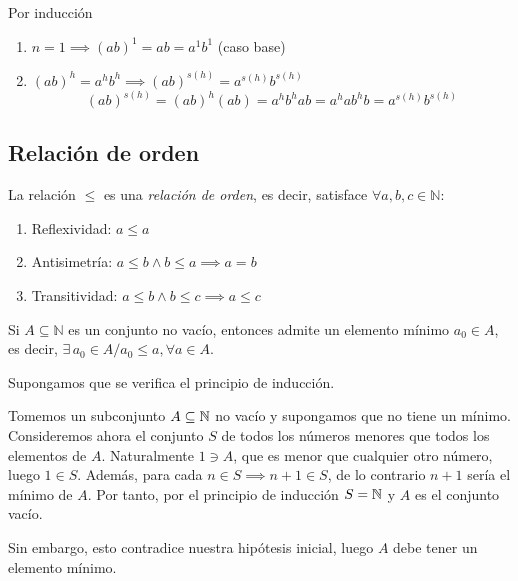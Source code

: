 \begin{fmd-proof}
	 Por inducción
	\begin{enumerate}[label=\roman*)]
		\item $n=1 \implies (ab)^1 = ab = a^1 b^1$ (caso base)
		\item $(ab)^h = a^h b^h \implies (ab)^{s(h)} = a^{s(h)}b^{s(h)}$
		\[ (ab)^{s(h)} = (ab)^h (ab) = a^hb^hab = a^ha b^hb = a^{s(h)}b^{s(h)} \]
	\end{enumerate}
\end{fmd-proof}


\subsection{Relación de orden}
\vspace{3mm}
\begin{fmd-definition}
	La relación $\le$ es una \textit{relación de orden}, es decir, satisface $\forall a, b, c \in \mathbb{N}$:
	\begin{enumerate}
		\item Reflexividad: $a \le a $
		\item Antisimetría: $a \le b \land b \le a \implies a=b$
		\item Transitividad: $a \le b \land b \le c \implies a \le c$
	\end{enumerate}
\end{fmd-definition}

\begin{fmd-theorem} 
	Si $A \subseteq \mathbb{N}$ es un conjunto no vacío, entonces admite un elemento mínimo $a_0 \in A$, es decir, $\exists \, a_0 \in A / a_0 \le a, \forall a \in A$.
\end{fmd-theorem}

\begin{fmd-proof}
	Supongamos que se verifica el principio de inducción.
	
	Tomemos un subconjunto $A \subseteq \mathbb{N}$ no vacío y supongamos que no tiene un mínimo. Consideremos ahora el conjunto $S$ de todos los números menores que todos los elementos de $A$. Naturalmente $1 \ni A$, que es menor que cualquier otro número, luego $1 \in S$. Además, para cada $n \in S \implies n + 1 \in S$, de lo contrario $n+1$ sería el mínimo de $A$. Por tanto, por el principio de inducción $S = \mathbb{N}$ y $A$ es el conjunto vacío.
	
	Sin embargo, esto contradice nuestra hipótesis inicial, luego $A$ debe tener un elemento mínimo.
\end{fmd-proof}

